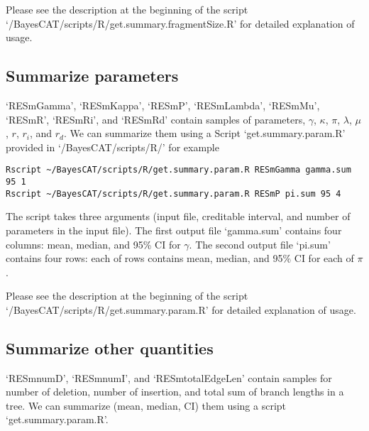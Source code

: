 \documentclass[11pt]{article}
\begin{document}
Please see the description at the beginning of the script `/BayesCAT/scripts/R/get.summary.fragmentSize.R' for detailed explanation of usage.

\subsection{Summarize parameters}
\label{sec-5-5}
`RESmGamma', `RESmKappa', `RESmP', `RESmLambda', `RESmMu', `RESmR', `RESmRi',  and `RESmRd' contain samples of parameters, $\gamma$, $\kappa$, $\pi$, $\lambda$, $\mu$, $r$, $r_i$, and $r_d$. We can summarize them using a Script `get.summary.param.R' provided in `/BayesCAT/scripts/R/' for example
\begin{lstlisting}
Rscript ~/BayesCAT/scripts/R/get.summary.param.R RESmGamma gamma.sum 95 1
Rscript ~/BayesCAT/scripts/R/get.summary.param.R RESmP pi.sum 95 4
\end{lstlisting}
The script takes three arguments (input file, creditable interval, and number of parameters in the input file). The first output file `gamma.sum' contains four columns: mean, median, and 95\% CI for $\gamma$. The second output file `pi.sum' contains four rows: each of rows contains mean, median, and 95\% CI for each of $\pi$. 

Please see the description at the beginning of the script `/BayesCAT/scripts/R/get.summary.param.R' for detailed explanation of usage.

\subsection{Summarize other quantities}
\label{sec-5-6}
`RESmnumD', `RESmnumI', and `RESmtotalEdgeLen' contain samples for number of deletion, number of insertion, and total sum of branch lengths in a tree. We can summarize (mean, median, CI) them using a script `get.summary.param.R'.
\end{document}
